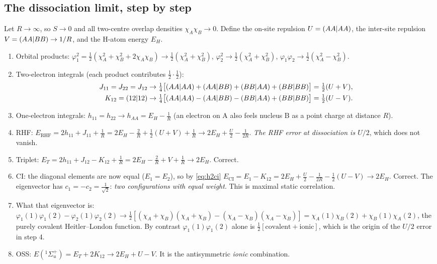 \subsection{The dissociation limit, step by step}
Let $R\to\infty$, so $S\to0$ and all two-centre overlap densities $\chi_A\chi_B\to0$. Define the on-site
repulsion $U=(AA\vert AA)$, the inter-site repulsion $V=(AA\vert BB)\to1/R$, and the H-atom energy $E_H$.
\begin{enumerate}
  \item Orbital products: $\varphi_1^2=\tfrac12(\chi_A^2+\chi_B^2+2\chi_A\chi_B)\to\tfrac12(\chi_A^2+\chi_B^2)$,
        $\varphi_2^2\to\tfrac12(\chi_A^2+\chi_B^2)$, $\varphi_1\varphi_2\to\tfrac12(\chi_A^2-\chi_B^2)$.
  \item Two-electron integrals (each product contributes $\tfrac12\cdot\tfrac12$):
        \begin{align*}
        J_{11}=J_{22}=J_{12}&\to\tfrac14\bigl[(AA\vert AA)+(AA\vert BB)+(BB\vert AA)+(BB\vert BB)\bigr]=\tfrac12(U+V),\\
        K_{12}=(12\vert 12)&\to\tfrac14\bigl[(AA\vert AA)-(AA\vert BB)-(BB\vert AA)+(BB\vert BB)\bigr]=\tfrac12(U-V).
        \end{align*}
  \item One-electron integrals: $h_{11}=h_{22}\to h_{AA}=E_H-\tfrac1R$ (an electron on A also feels nucleus B
        as a point charge at distance $R$).
  \item RHF: $E_{\text{RHF}}=2h_{11}+J_{11}+\tfrac1R=2E_H-\tfrac2R+\tfrac12(U+V)+\tfrac1R\to2E_H+\tfrac U2-\tfrac1{2R}$.
        \emph{The RHF error at dissociation is $U/2$}, which does not vanish.
  \item Triplet: $E_T=2h_{11}+J_{12}-K_{12}+\tfrac1R=2E_H-\tfrac2R+V+\tfrac1R\to2E_H$. Correct.
  \item CI: the diagonal elements are now equal ($E_1=E_2$), so by \cref{eq:h2ci}
        $E_{\text{CI}}=E_1-K_{12}=2E_H+\tfrac U2-\tfrac1{2R}-\tfrac12(U-V)\to2E_H$. Correct.
        The eigenvector has $c_1=-c_2=\tfrac1{\sqrt2}$: \emph{two configurations with equal weight}. This is
        maximal static correlation.
  \item What that eigenvector is: $\varphi_1(1)\varphi_1(2)-\varphi_2(1)\varphi_2(2)\to\tfrac12[(\chi_A+\chi_B)(\chi_A+\chi_B)-(\chi_A-\chi_B)(\chi_A-\chi_B)]
        =\chi_A(1)\chi_B(2)+\chi_B(1)\chi_A(2)$, the purely covalent Heitler--London function. By contrast
        $\varphi_1(1)\varphi_1(2)$ alone is $\tfrac12[\text{covalent}+\text{ionic}]$, which is the origin of the
        $U/2$ error in step 4.
  \item OSS: $E(^1\Sigma_u^+)=E_T+2K_{12}\to2E_H+U-V$. It is the antisymmetric \emph{ionic} combination.
\end{enumerate}

